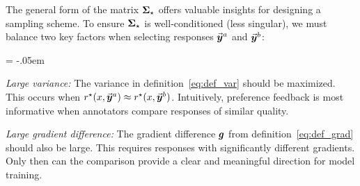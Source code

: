     The general form of the matrix $\boldsymbol{\Sigma}_{\star}$ offers valuable insights for designing a sampling scheme. To ensure $\boldsymbol{\Sigma}_{\star}$ is well-conditioned (less singular), we must balance two key factors when selecting responses $\vec{\boldsymbol{y}}\!\,^a$ and $\vec{\boldsymbol{y}}\!\,^b$:
    \begin{description} \itemsep = -.05em
        \item \emph{Large variance:} The variance in definition~\eqref{eq:def_var} should be maximized. This occurs when $r^{\star}(x, \vec{\boldsymbol{y}}\!\,^a) \approx r^{\star}(x, \vec{\boldsymbol{y}}\!\,^b)$. Intuitively, preference feedback is most informative when annotators compare responses of similar quality.
        \item \emph{Large gradient difference:} The gradient difference $\boldsymbol{g}$ from definition~\eqref{eq:def_grad} should also be large. This requires responses with significantly different gradients. Only then can the comparison provide a clear and meaningful direction for model training.
    \end{description}

		
		
		
		


		
	